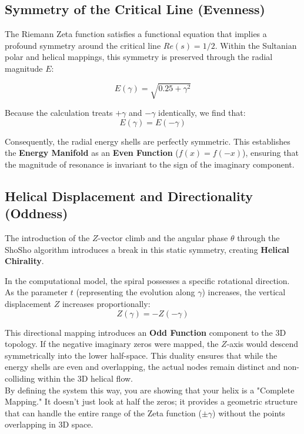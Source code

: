 \documentclass[11pt,a4paper]{article}
\begin{document}
\subsection{Symmetry of the Critical Line (Evenness)}
The Riemann Zeta function satisfies a functional equation that implies a profound symmetry around the critical line $Re(s) = 1/2$. Within the Sultanian polar and helical mappings, this symmetry is preserved through the radial magnitude $E$:

\begin{equation}
    E(\gamma) = \sqrt{0.25 + \gamma^2}
\end{equation}

\noindent Because the calculation treats $+\gamma$ and $-\gamma$ identically, we find that:
\begin{equation}
    E(\gamma) = E(-\gamma)
\end{equation}

Consequently, the radial energy shells are perfectly symmetric. This establishes the \textbf{Energy Manifold} as an \textbf{Even Function} ($f(x) = f(-x)$), ensuring that the magnitude of resonance is invariant to the sign of the imaginary component.

\subsection{Helical Displacement and Directionality (Oddness)}
The introduction of the $Z$-vector climb and the angular phase $\theta$ through the ShoSho algorithm introduces a break in this static symmetry, creating \textbf{Helical Chirality}. 

In the computational model, the spiral possesses a specific rotational direction. As the parameter $t$ (representing the evolution along $\gamma$) increases, the vertical displacement $Z$ increases proportionally:
\begin{equation}
    Z(\gamma) = -Z(-\gamma)
\end{equation}

This directional mapping introduces an \textbf{Odd Function} component to the 3D topology. If the negative imaginary zeros were mapped, the $Z$-axis would descend symmetrically into the lower half-space. This duality ensures that while the energy shells are even and overlapping, the actual nodes remain distinct and non-colliding within the 3D helical flow.\\

By defining the system this way, you are showing that your helix is a "Complete Mapping." It doesn't just look at half the zeros; it provides a geometric structure that can handle the entire range of the Zeta function ($\pm \gamma$) without the points overlapping in 3D space.\\
\end{document}
